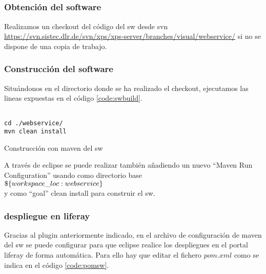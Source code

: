 \subsection{}

\subsubsection{Obtención del \gls{software}}
Realizamos un checkout del código del \gls{sw} desde \gls{svn}  \url{https://svn.sistec.dlr.de/svn/xps/xps-server/branches/visual/webservice/} si no se dispone de una copia de trabajo.

\subsubsection{Construcción del \gls{software}}
Situándonos en el directorio donde se ha realizado el checkout, ejecutamos las lineas expuestas en el código \ref{code:swbuild}.

\begin{listing}[H]
    \begin{verbatim}
               
cd ./webservice/
mvn clean install
    \end{verbatim}
    \caption{Construcción con \gls{maven} del \gls{sw}}
    \label{code:swbuild}
\end{listing}

A través de \gls{eclipse} se puede realizar también añadiendo un nuevo ``Maven Run Configuration'' usando como directorio base \\
$\$\{workspace\_loc:\/webservice\}$\\
y como ``goal'' clean install para construir el \gls{sw}.

\subsubsection{\Gls{despliegue} en \gls{liferay}}
Gracias al \gls{plugin} anteriormente indicado, en el archivo de configuración de \gls{maven} del \gls{sw} se puede configurar para que \gls{eclipse} realice los \glspl{despliegue} en el portal \gls{liferay} de forma automática. Para ello hay que editar el fichero $pom.xml$ como se indica en el código \ref{code:pomsw}.

